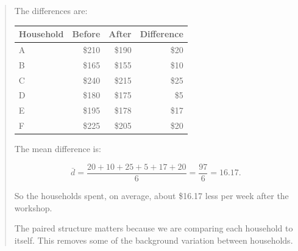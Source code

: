 \documentclass[
  letterpaper,
  DIV=11,
  numbers=noendperiod]{scrreprt}
\begin{document}
\begin{tcolorbox}
\begin{quote}
The differences are:

\begin{table}
\fontsize{12.0pt}{14.0pt}\selectfont
\begin{tabular*}{\linewidth}{@{\extracolsep{\fill}}lrrr}
\toprule
Household & Before & After & Difference \\ 
\midrule\addlinespace[2.5pt]
A & \$210 & \$190 & \$20 \\ 
B & \$165 & \$155 & \$10 \\ 
C & \$240 & \$215 & \$25 \\ 
D & \$180 & \$175 & \$5 \\ 
E & \$195 & \$178 & \$17 \\ 
F & \$225 & \$205 & \$20 \\ 
\bottomrule
\end{tabular*}
\end{table}

The mean difference is:

\[
\bar{d}
=
\frac{20+10+25+5+17+20}{6}
=
\frac{97}{6}
=
16.17.
\]

So the households spent, on average, about \$16.17 less per week after
the workshop.

The paired structure matters because we are comparing each household to
itself. This removes some of the background variation between
households.
\end{quote}

\end{tcolorbox}
\end{document}
